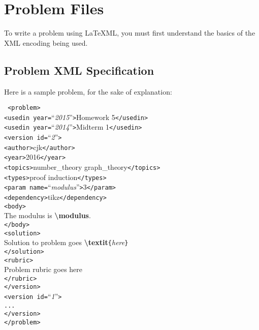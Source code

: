 \section{Problem Files}
  To write a problem using \LaTeX ML, you must first understand the basics of the XML encoding being used.
  
  \subsection{Problem XML Specification}
    Here is a sample problem, for the sake of explanation:
{
  \newcommand\TB{\hspace*{1em}}
    \begin{mdframed}
      \texttt{
<problem>\\
\TB<usedin year=}``\textit{2015}''\texttt{>}Homework 5\texttt{</usedin>\\
\TB<usedin year=}``\textit{2014}''\texttt{>}Midterm 1\texttt{</usedin>\\
\TB<version id=}``\textit{2}''\texttt{>\\
\TB\TB<author>}cjk\texttt{</author>\\
\TB\TB<year>}2016\texttt{</year>\\
\TB\TB<topics>}number\_theory graph\_theory\texttt{</topics>\\
\TB\TB<types>}proof induction\texttt{</types>\\
\TB\TB<param name=}``\textit{modulus}''\texttt{>}3\texttt{</param>\\
\TB\TB<dependency>}tikz\texttt{</dependency>\\
\TB\TB<body>}\\
\TB\TB\TB The modulus is \textbf{\textbackslash modulus}.\\
\TB\TB\texttt{</body>\\
\TB\TB<solution>}\\
\TB\TB\TB Solution to problem goes 
  \textbf{\textbackslash textit}\texttt{\{}\textit{here}\texttt{\}}\\
\TB\TB\texttt{</solution>\\
\TB\TB<rubric>\\
\TB\TB\TB}Problem rubric goes here\texttt{\\
\TB\TB</rubric>\\
\TB</version>\\
\TB<version id=}``\textit{1}''\texttt{>\\
\TB\TB...\\
\TB</version>\\
</problem>
}
    \end{mdframed}
    
}
